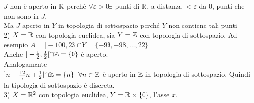 \documentclass{article}
\begin{document}
	   $J$ non è aperto in $\mathbb{R}$ perché  $\forall\varepsilon > 0 \exists$ punti di $\mathbb{R}$, a distanza $< \varepsilon$ da $0$, punti che non sono in $J$.\\
	   Ma  $J$ aperto in $Y$ in topologia di sottospazio perché $Y$ non contiene tali punti\\
	   2) $X = \mathbb{R}$ con topologia euclidea, sia $Y = \mathbb{Z}$ con topologia di sottospazio, Ad esempio  $A = ]-100, 23[\cap Y = \{-99,-98,\ldots,22\}$\\
	   Anche $]-\frac 12, \frac 12[\cap \mathbb{Z} = \{0\}$ è aperto.\\
	   Analogamente\\
	   $]n - \frac {12}, n + \frac 12[\cap \mathbb{Z} = \{n\} \ \ \forall n\in \mathbb{Z}$ è aperto in  $\mathbb{Z}$ in topologia di sottospazio. Quindi la tipologia di sottospazio è discreta.\\
	   3) $X = \mathbb{R}^2$ con topologia euclidea, $Y = \mathbb{R} \times \{0\}$, l'asse  $x.$\\
\end{document}
